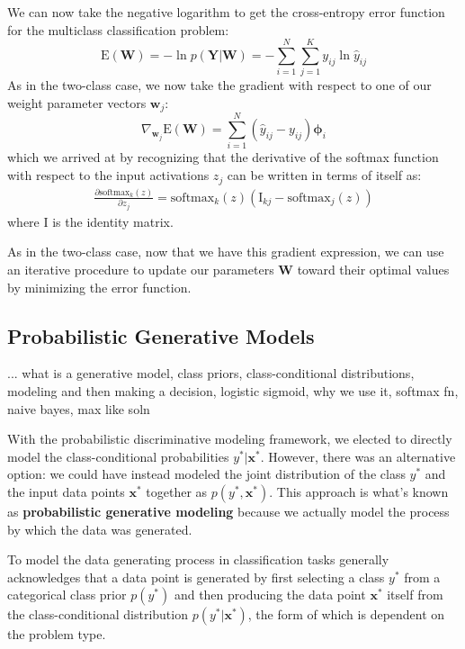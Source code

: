 We can now take the negative logarithm to get the cross-entropy error function for the multiclass classification problem:
\begin{equation} \label{multi-class-cross-entropy-error-fn}
	\mathrm{E}(\textbf{W}) = - \ln{p(\textbf{Y}|\textbf{W})} = - \sum_{i=1}^{N}\sum_{j=1}^{K} y_{ij} \ln{\hat{y}_{ij}}
\end{equation}
As in the two-class case, we now take the gradient with respect to one of our weight parameter vectors $\textbf{w}_{j}$:
\begin{equation} \label{multi-class-log-reg-gradient}
	\nabla_{\textbf{w}_{j}} \mathrm{E}(\textbf{W}) = \sum_{i=1}^{N}(\hat{y}_{ij} - y_{ij})\boldsymbol{\phi}_{i}
\end{equation}
which we arrived at by recognizing that the derivative of the softmax function with respect to the input activations $z_{j}$ can be written in terms of itself as:
\begin{align*}
	\frac{\partial \text{softmax}_{k}(z)}{\partial z_{j}} = \text{softmax}_{k}(z)(\mathrm{I}_{kj} - \text{softmax}_{j}(z))
\end{align*}
where $\mathrm{I}$ is the identity matrix.

As in the two-class case, now that we have this gradient expression, we can use an iterative procedure to update our parameters $\textbf{W}$ toward their optimal values by minimizing the error function.

\subsection{Probabilistic Generative Models}
... what is a generative model, class priors, class-conditional distributions, modeling and then making a decision, logistic sigmoid, why we use it, softmax fn, naive bayes, max like soln

With the probabilistic discriminative modeling framework, we elected to directly model the class-conditional probabilities $y^{*}|\textbf{x}^{*}$. However, there was an alternative option: we could have instead modeled the joint distribution of the class $y^{*}$ and the input data points $\textbf{x}^{*}$ together as $p(y^{*}, \textbf{x}^{*})$. This approach is what's known as \textbf{probabilistic generative modeling} because we actually model the process by which the data was generated.

To model the data generating process in classification tasks generally acknowledges that a data point is generated by first selecting a class $y^{*}$ from a categorical class prior $p(y^{*})$ and then producing the data point $\textbf{x}^{*}$ itself from the class-conditional distribution $p(y^{*}|\textbf{x}^{*})$, the form of which is dependent on the problem type.

